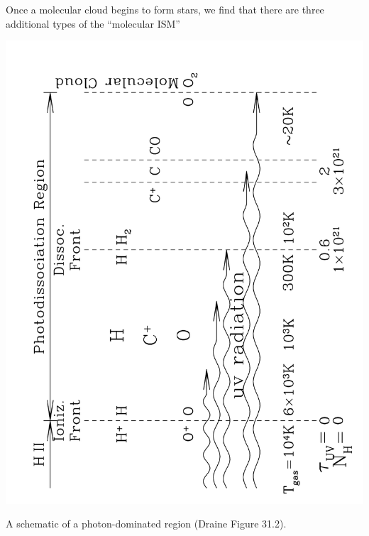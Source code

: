 \documentclass{tufte-handout}
\begin{document}
Once a molecular cloud begins to form stars, we find that there are three additional types of the ``molecular ISM''
\begin{marginfigure}
\includegraphics[angle=-90]{ism_figures/Draine-31_2}
\caption{A schematic of a photon-dominated region (Draine Figure 31.2).}
\end{marginfigure}
\end{document}
